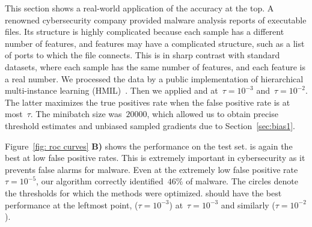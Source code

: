 This section shows a real-world application of the accuracy at the top. A renowned cybersecurity company provided malware analysis reports of executable files. Its structure is highly complicated because each sample has a different number of features, and features may have a complicated structure, such as a list of ports to which the file connects. This is in sharp contrast with standard datasets, where each sample has the same number of features, and each feature is a real number. We processed the data by a public implementation of hierarchical multi-instance learning (HMIL)~\cite{pevny2017using}. Then we applied \DeepTopPush and \PatMatNP at~$\tau=10^{-3}$ and~$\tau=10^{-2}$. The latter maximizes the true positives rate when the false positive rate is at most~$\tau$. The minibatch size was~$20000$, which allowed us to obtain precise threshold estimates and unbiased sampled gradients due to Section~\ref{sec:bias1}.

Figure~\ref{fig: roc curves} \textbf{B)} shows the performance on the test set. \DeepTopPush is again the best at low false positive rates. This is extremely important in cybersecurity as it prevents false alarms for malware. Even at the extremely low false positive rate~$\tau=10^{-5}$, our algorithm correctly identified~$46\%$ of malware. The circles denote the thresholds for which the methods were optimized. \DeepTopPush should have the best performance at the leftmost point, \PatMatNP ($\tau=10^{-3}$) at~$\tau=10^{-3}$ and similarly \PatMatNP($\tau=10^{-2}$).